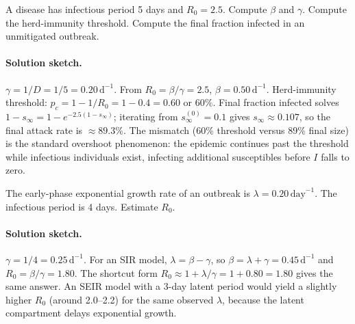 \begin{exercise}
A disease has infectious period 5 days and $R_0 = 2.5$. Compute
$\beta$ and $\gamma$. Compute the herd-immunity threshold. Compute
the final fraction infected in an unmitigated outbreak.

\paragraph{Solution sketch.} $\gamma = 1/D = 1/5 =
0.20\,\text{d}^{-1}$. From $R_0 = \beta/\gamma = 2.5$,
$\beta = 0.50\,\text{d}^{-1}$. Herd-immunity threshold:
$p_c = 1 - 1/R_0 = 1 - 0.4 = 0.60$ or 60\%. Final fraction
infected solves $1 - s_\infty = 1 - e^{-2.5(1 - s_\infty)}$;
iterating from $s_\infty^{(0)} = 0.1$ gives $s_\infty \approx
0.107$, so the final attack rate is $\approx 89.3\%$. The mismatch
(60\% threshold versus 89\% final size) is the standard
overshoot phenomenon: the epidemic continues past the threshold
while infectious individuals exist, infecting additional
susceptibles before $I$ falls to zero.
\end{exercise}

\begin{exercise}
The early-phase exponential growth rate of an outbreak is
$\lambda = 0.20\,\text{day}^{-1}$. The infectious period is 4 days.
Estimate $R_0$.

\paragraph{Solution sketch.} $\gamma = 1/4 = 0.25\,\text{d}^{-1}$.
For an SIR model, $\lambda = \beta - \gamma$, so $\beta = \lambda
+ \gamma = 0.45\,\text{d}^{-1}$ and $R_0 = \beta/\gamma = 1.80$.
The shortcut form $R_0 \approx 1 + \lambda/\gamma = 1 + 0.80 = 1.80$
gives the same answer. An SEIR model with a 3-day latent period
would yield a slightly higher $R_0$ (around 2.0--2.2) for the same
observed $\lambda$, because the latent compartment delays
exponential growth.
\end{exercise}

